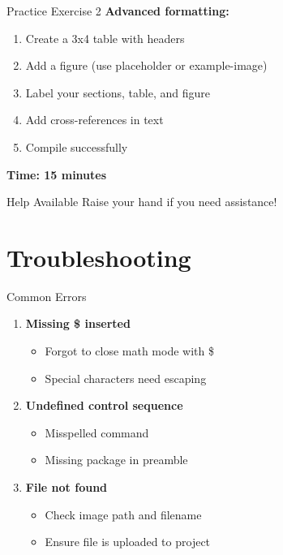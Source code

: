 \documentclass[aspectratio=169]{beamer}
\begin{document}
	\begin{frame}{Practice Exercise 2}
		\textbf{Advanced formatting:}
		
		\begin{enumerate}
			\item Create a 3x4 table with headers
			\item Add a figure (use placeholder or example-image)
			\item Label your sections, table, and figure
			\item Add cross-references in text
			\item Compile successfully
		\end{enumerate}
		
		\vspace{1em}
		
		\textbf{Time: 15 minutes}
		
		\vspace{0.5em}
		
		\begin{block}{Help Available}
			Raise your hand if you need assistance!
		\end{block}
	\end{frame}
	
	\section{Troubleshooting}
	
	\begin{frame}{Common Errors}
		\begin{enumerate}
			\item \textbf{Missing \$ inserted}
			\begin{itemize}
				\item Forgot to close math mode with \$
				\item Special characters need escaping
			\end{itemize}
			
			\item \textbf{Undefined control sequence}
			\begin{itemize}
				\item Misspelled command
				\item Missing package in preamble
			\end{itemize}
			
			\item \textbf{File not found}
			\begin{itemize}
				\item Check image path and filename
				\item Ensure file is uploaded to project
			\end{itemize}
		\end{enumerate}
	\end{frame}
	
\end{document}
